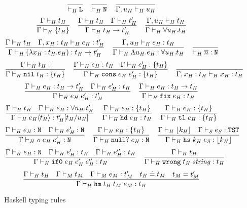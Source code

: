 \begin{figure}[p]
\[
\frac
{}
{ \vdash_{\mathit{H}} \mathtt{L}}
\quad
\frac
{}
{ \vdash_{\mathit{H}} \mathtt{N}}
\quad
\frac
{}
{\Gamma , u_{\mathit{H}} \vdash_{\mathit{H}} u_{\mathit{H}}}
\]
\[
\frac
{\Gamma \vdash_{\mathit{H}} t_{\mathit{H}}}
{\Gamma \vdash_{\mathit{H}} \lbrace t_{\mathit{H}} \rbrace}
\quad
\frac
{\Gamma \vdash_{\mathit{H}} t_{\mathit{H}} \quad \Gamma \vdash_{\mathit{H}} t_{\mathit{H}}'}
{\Gamma \vdash_{\mathit{H}} t_{\mathit{H}} \rightarrow t_{\mathit{H}}'}
\quad
\frac
{\Gamma, u_{\mathit{H}} \vdash_{\mathit{H}} t_{\mathit{H}}}
{\Gamma \vdash_{\mathit{H}} \forall u_{\mathit{H}} . t_{\mathit{H}}}
\]
\bigskip
\[
\frac
{\Gamma \vdash_{\mathit{H}} t_{\mathit{H}} \quad \Gamma , x_{\mathit{H}} : t_{\mathit{H}} \vdash_{\mathit{H}} e_{\mathit{H}} : t_{\mathit{H}}'}
{\Gamma \vdash_{\mathit{H}} (\lambda x_{\mathit{H}} : t_{\mathit{H}} . e_{\mathit{H}}) : t_{\mathit{H}} \rightarrow t_{\mathit{H}}'}
\quad
\frac
{\Gamma , u_{\mathit{H}} \vdash_{\mathit{H}} e_{\mathit{H}} : t_{\mathit{H}}}
{\Gamma \vdash_{\mathit{H}} \Lambda u_{\mathit{H}} . e_{\mathit{H}} : \forall u_{\mathit{H}} . t_{\mathit{H}}}
\quad
\frac
{}
{ \vdash_{\mathit{H}} \overline{n} : \mathtt{N}}
\]
\[
\frac
{\judeh{\env}{\vartyh}}
{\judeh{\env}{\expnils{\vartyh}}{\tylist{\vartyh}}}
\quad
\frac
{\judeh{\env}{\first{\varexph}}{\vartyh} \quad \judeh{\env}{\second{\varexph}}{\tylist{\vartyh}}}
{\judeh{\env}{\expcons{\first{\varexph}}{\second{\varexph}}}{\tylist{\vartyh}}}
\quad
\frac
{}
{\judeh{\envexte{\env}{\varvarh}{\vartyh}}{\varvarh}{\vartyh}}
\]
\[
\frac
{\Gamma \vdash_{\mathit{H}} e_{\mathit{H}} : t_{\mathit{H}} \rightarrow t_{\mathit{H}}' \quad \Gamma \vdash_{\mathit{H}} e_{\mathit{H}}' : t_{\mathit{H}}}
{\Gamma\vdash_{\mathit{H}}e_{\mathit{H}} \; e_{\mathit{H}}':t_{\mathit{H}}'}
\quad
\frac
{\Gamma \vdash_{\mathit{H}} e_{\mathit{H}} : t_{\mathit{H}} \rightarrow t_{\mathit{H}}}
{\Gamma \vdash_{\mathit{H}} \mathtt{fix} \; e_{\mathit{H}} : t_{\mathit{H}}}
\]
\[
\frac
{\Gamma \vdash_{\mathit{H}} t_{\mathit{H}} \quad \Gamma \vdash_{\mathit{H}} e_{\mathit{H}} : \forall u_{\mathit{H}} . t_{\mathit{H}}'}
{\Gamma \vdash_{\mathit{H}} e_{\mathit{H}} \langle t_{\mathit{H}} \rangle : t_{\mathit{H}}'[t_{\mathit{H}}/u_{\mathit{H}}]}
\quad
\frac
{\Gamma \vdash_{\mathit{H}} e_{\mathit{H}} : \lbrace t_{\mathit{H}} \rbrace}
{\Gamma \vdash_{\mathit{H}} \mathtt{hd} \; e_{\mathit{H}} : t_{\mathit{H}}}
\quad
\frac
{\Gamma \vdash_{\mathit{H}} e_{\mathit{H}} : \lbrace t_{\mathit{H}} \rbrace}
{\Gamma \vdash_{\mathit{H}} \mathtt{tl} \; e_{\mathit{H}} : \lbrace t_{\mathit{H}} \rbrace}
\]
\[
\frac
{\Gamma \vdash_{\mathit{H}} e_{\mathit{H}} : \mathtt{N} \quad \Gamma \vdash_{\mathit{H}} e_{\mathit{H}}' : \mathtt{N}}
{\Gamma \vdash_{\mathit{H}} \mathit{o} \; e_{\mathit{H}} \; e_{\mathit{H}}' : \mathtt{N}}
\quad
\frac
{\Gamma \vdash_{\mathit{H}} e_{\mathit{H}} : \lbrace t_{\mathit{H}} \rbrace}
{\Gamma \vdash_{\mathit{H}} \mathtt{null?} \; e_{\mathit{H}} : \mathtt{N}}
\quad
\frac
{\Gamma \vdash_{\mathit{H}} \lfloor k_{\mathit{H}} \rfloor \quad \Gamma \vdash_{\mathit{S}} e_{\mathit{S}} : \mathtt{TST}}
{\Gamma \vdash_{\mathit{H}} \mathtt{hs} \; k_{\mathit{H}} \; e_{\mathit{S}} : \lfloor k_{\mathit{H}} \rfloor}
\]
\[
\frac
{\Gamma \vdash_{\mathit{H}} e_{\mathit{H}} : \mathtt{N} \quad \Gamma \vdash_{\mathit{H}} e_{\mathit{H}}' : t_{\mathit{H}} \quad \Gamma \vdash_{\mathit{H}} e_{\mathit{H}}'' : t_{\mathit{H}}}
{\Gamma \vdash_{\mathit{H}} \mathtt{if0} \; e_{\mathit{H}} \; e_{\mathit{H}}' \; e_{\mathit{H}}'' : t_{\mathit{H}}}
\quad
\frac
{\Gamma \vdash_{\mathit{H}} t_{\mathit{H}}}
{\Gamma \vdash_{\mathit{H}} \mathtt{wrong} \; t_{\mathit{H}} \; \mathit{string} : t_{\mathit{H}}}
\]
\[
\frac
{\Gamma \vdash_{\mathit{H}} t_{\mathit{H}} \quad \Gamma \vdash_{\mathit{M}} t_{\mathit{M}} \quad \Gamma \vdash_{\mathit{M}} e_{\mathit{M}} : t_{\mathit{M}}' \quad t_{\mathit{H}} \doteq t_{\mathit{M}} \quad t_{\mathit{M}} = t_{\mathit{M}}'}
{\Gamma \vdash_{\mathit{H}} \mathtt{hm} \; t_{\mathit{H}} \; t_{\mathit{M}} \; e_{\mathit{M}} : t_{\mathit{H}}}
\]
\caption{Haskell typing rules}
\label{fightr}
\end{figure}